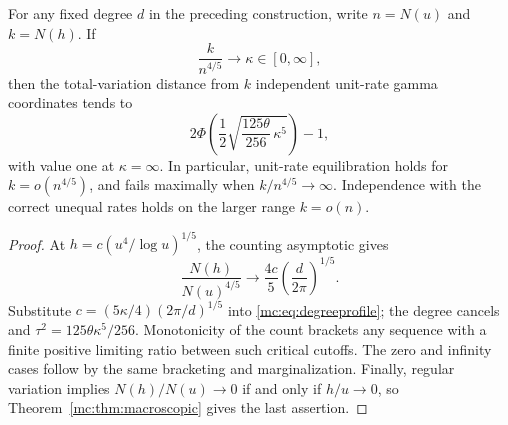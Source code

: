\begin{corollary}
\label{mc:cor:four-fifths}
For any fixed degree $d$ in the preceding construction, write
$n=N(u)$ and $k=N(h)$.  If
\[
 \frac{k}{n^{4/5}}\longrightarrow\kappa\in[0,\infty],
\]
then the total-variation distance from $k$ independent unit-rate gamma
coordinates tends to
\begin{equation}\label{mc:eq:countprofile}
 2\Phi\left(\frac12\sqrt{\frac{125\theta}{256}\,\kappa^5}\right)-1,
\end{equation}
with value one at $\kappa=\infty$.  In particular, unit-rate
equilibration holds for $k=o(n^{4/5})$, and fails maximally when
$k/n^{4/5}\to\infty$.  Independence with the correct unequal rates
holds on the larger range $k=o(n)$.
\end{corollary}

\begin{proof}
At $h=c(u^4/\log u)^{1/5}$, the counting asymptotic gives
\[
 \frac{N(h)}{N(u)^{4/5}}
 \longrightarrow\frac{4c}{5}
                     \left(\frac d{2\pi}\right)^{1/5}.
\]
Substitute
$c=(5\kappa/4)(2\pi/d)^{1/5}$ into
\eqref{mc:eq:degreeprofile}; the degree cancels and
$\tau^2=125\theta\kappa^5/256$.
Monotonicity of the count brackets any sequence with a finite positive
limiting ratio between such critical cutoffs.  The zero and infinity
cases follow by the same bracketing and marginalization.  Finally,
regular variation implies $N(h)/N(u)\to0$ if and only if $h/u\to0$,
so Theorem~\ref{mc:thm:macroscopic} gives the last assertion.
\end{proof}


